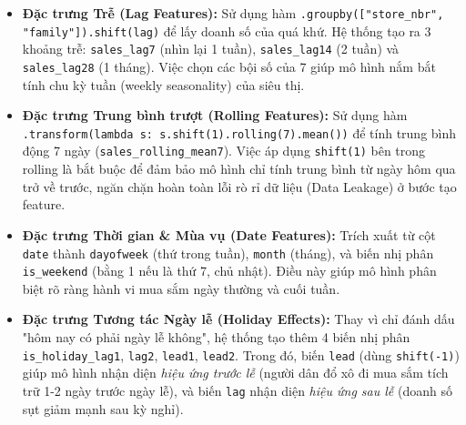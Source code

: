 \documentclass[12pt,a4paper]{report}
\begin{document}
\begin{itemize}
    \item \textbf{Đặc trưng Trễ (Lag Features):} Sử dụng hàm \texttt{.groupby(["store\_nbr", "family"]).shift(lag)} để lấy doanh số của quá khứ. Hệ thống tạo ra 3 khoảng trễ: \texttt{sales\_lag7} (nhìn lại 1 tuần), \texttt{sales\_lag14} (2 tuần) và \texttt{sales\_lag28} (1 tháng). Việc chọn các bội số của 7 giúp mô hình nắm bắt tính chu kỳ tuần (weekly seasonality) của siêu thị.
    
    \item \textbf{Đặc trưng Trung bình trượt (Rolling Features):} Sử dụng hàm \texttt{.transform(lambda s: s.shift(1).rolling(7).mean())} để tính trung bình động 7 ngày (\texttt{sales\_rolling\_mean7}). Việc áp dụng \texttt{shift(1)} bên trong rolling là bắt buộc để đảm bảo mô hình chỉ tính trung bình từ ngày hôm qua trở về trước, ngăn chặn hoàn toàn lỗi rò rỉ dữ liệu (Data Leakage) ở bước tạo feature.
    
    \item \textbf{Đặc trưng Thời gian \& Mùa vụ (Date Features):} Trích xuất từ cột \texttt{date} thành \texttt{dayofweek} (thứ trong tuần), \texttt{month} (tháng), và biến nhị phân \texttt{is\_weekend} (bằng 1 nếu là thứ 7, chủ nhật). Điều này giúp mô hình phân biệt rõ ràng hành vi mua sắm ngày thường và cuối tuần.
    
    \item \textbf{Đặc trưng Tương tác Ngày lễ (Holiday Effects):} Thay vì chỉ đánh dấu "hôm nay có phải ngày lễ không", hệ thống tạo thêm 4 biến nhị phân \texttt{is\_holiday\_lag1}, \texttt{lag2}, \texttt{lead1}, \texttt{lead2}. Trong đó, biến \texttt{lead} (dùng \texttt{shift(-1)}) giúp mô hình nhận diện \textit{hiệu ứng trước lễ} (người dân đổ xô đi mua sắm tích trữ 1-2 ngày trước ngày lễ), và biến \texttt{lag} nhận diện \textit{hiệu ứng sau lễ} (doanh số sụt giảm mạnh sau kỳ nghỉ).
\end{itemize}
\end{document}
